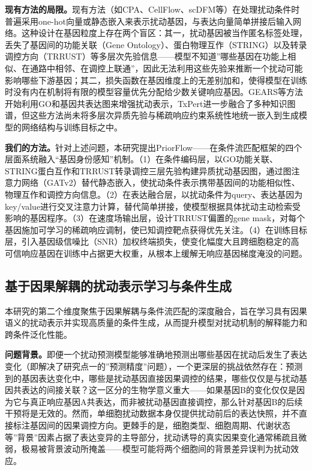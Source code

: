 \textbf{现有方法的局限。}现有方法（如CPA、CellFlow、scDFM等）在处理扰动条件时普遍采用one-hot向量或静态嵌入来表示扰动基因，与表达向量简单拼接后输入网络。这种设计在基因粒度上存在两个盲区：其一，扰动基因被当作匿名标签处理，丢失了基因间的功能关联（Gene Ontology）、蛋白物理互作（STRING）以及转录调控方向（TRRUST）等多层次先验信息——模型不知道”哪些基因在功能上相似、在通路中相邻、在调控上联通”，因此无法利用这些先验来推断一个扰动可能影响哪些下游基因；其二，损失函数在基因维度上的无差别加和，使得模型在训练时没有内在机制将有限的模型容量优先分配给少数关键响应基因。GEARS等方法开始利用GO和基因共表达图来增强扰动表示，TxPert进一步融合了多种知识图谱，但这些方法尚未将多层次异质先验与稀疏响应约束系统性地统一嵌入到生成模型的网络结构与训练目标之中。

\textbf{我们的方法。}针对上述问题，本研究提出PriorFlow——在条件流匹配框架的四个层面系统融入“基因身份感知”机制。（1）在条件编码层，以GO功能关联、STRING蛋白互作和TRRUST转录调控三层先验构建异质扰动基因图，通过图注意力网络（GATv2）替代静态嵌入，使扰动条件表示携带基因间的功能相似性、物理互作和调控方向信息。（2）在表达融合层，以扰动条件为query、表达基因为key/value进行交叉注意力计算，替代简单拼接，使模型根据具体扰动主动检索受影响的基因程序。（3）在速度场输出层，设计TRRUST偏置的gene mask，对每个基因施加可学习的稀疏响应调制，使已知调控靶点获得优先关注。（4）在训练目标层，引入基因级信噪比（SNR）加权终端损失，使变化幅度大且跨细胞稳定的高可信响应基因在训练中占据更大权重，从根本上缓解无响应基因梯度淹没的问题。

\subsection{基于因果解耦的扰动表示学习与条件生成}

本研究的第二个维度聚焦于因果解耦与条件流匹配的深度融合，旨在学习具有因果语义的扰动表示并实现高质量的条件生成，从而提升模型对扰动机制的解释能力和跨条件泛化性能。

\textbf{问题背景。}即便一个扰动预测模型能够准确地预测出哪些基因在扰动后发生了表达变化（即解决了研究点一的”预测精度”问题），一个更深层的挑战依然存在：预测到的基因表达变化中，哪些是扰动基因直接因果调控的结果，哪些仅仅是与扰动基因共表达的间接关联？这一区分的生物学意义重大——如果基因B的变化仅仅是因为它与真正响应基因A共表达，而非被扰动基因直接调控，那么针对基因B的后续干预将是无效的。然而，单细胞扰动数据本身仅提供扰动前后的表达快照，并不直接标注基因间的因果调控方向。更棘手的是，细胞类型、细胞周期、代谢状态等”背景”因素占据了表达变异的主导部分，扰动诱导的真实因果变化通常稀疏且微弱，极易被背景波动所掩盖——模型可能将两个细胞间的背景差异误判为扰动效应。

